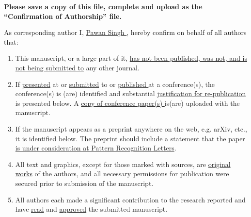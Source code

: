 \documentclass[times,twocolumn,final,authoryear]{elsarticle}
\begin{document}
	
	\thispagestyle{empty}
	
	\begin{table}[!th]
		
		\begin{minipage}{.9\textwidth}
			\baselineskip12pt
			\ifpreprint
			\vspace*{1pc}
			\else
			\vspace*{-6pc}
			\fi
			
			\vskip6pt
			
			
			\vskip1pc
			
			
			{\bf Please save a copy of this file, complete and upload as the
				``Confirmation of Authorship'' file.}
			
			\vskip1pc
			
			As corresponding author
			I, \underline{ Pawan Singh },
			hereby confirm on behalf of all authors that:
			
			\vskip1pc
			
			\begin{enumerate}
				\itemsep=3pt
				\item This manuscript, or a large part of it, \underline {has not been
					published,  was not, and is not being submitted to} any other journal.
				
				\item If \underline {presented} at or \underline {submitted} to or
				\underline  {published }at a conference(s), the conference(s) is (are)
				identified and  substantial \underline {justification for
					re-publication} is presented  below. A \underline {copy of
					conference paper(s) }is(are) uploaded with the  manuscript.
				
				\item If the manuscript appears as a preprint anywhere on the web, e.g.
				arXiv,  etc., it is identified below. The \underline {preprint should
					include a  statement that the paper is under consideration at Pattern
					Recognition  Letters}.
				
				\item All text and graphics, except for those marked with sources, are
				\underline  {original works} of the authors, and all necessary
				permissions for  publication were secured prior to submission of the
				manuscript.
				
				\item All authors each made a significant contribution to the research
				reported  and have \underline {read} and \underline {approved} the
				submitted  manuscript.
			\end{enumerate}
			

\end{minipage}
\end{table}
\end{document}
